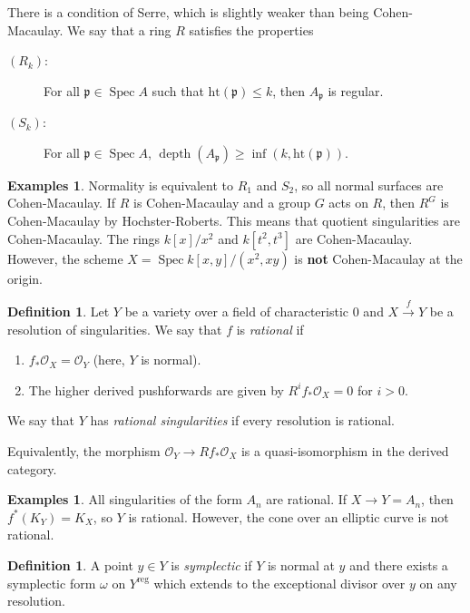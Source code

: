 \documentclass[leqno, openany]{memoir}
\theoremstyle{definition}
\newtheorem{defn}[thm]{Definition}
\newtheorem{exms}[thm]{Examples}
\theoremstyle{remark}
\theoremstyle{plain}
\theoremstyle{definition}
\theoremstyle{remark}
\newcommand{\mc}[1]{\mathcal{#1}}
\newcommand{\mf}[1]{\mathfrak{#1}}
\newcommand{\mr}[1]{\mathrm{#1}}
\DeclareMathOperator{\Spec}{Spec}
\begin{document}
There is a condition of Serre, which is slightly weaker than being Cohen-Macaulay. We say that a ring $R$ satisfies the properties
\begin{description}
    \item[$(R_k)$:] For all $\mf{p} \in \Spec A$ such that $\mr{ht}(\mf{p}) \leq k$, then $A_{\mf{p}}$ is regular.
    \item[$(S_k)$:] For all $\mf{p} \in \Spec A$, $\operatorname{depth}(A_{\mf{p}}) \geq \inf (k, \mr{ht}(\mf{p}))$.
\end{description}

\begin{exms}
    Normality is equivalent to $R_1$ and $S_2$, so all normal surfaces are Cohen-Macaulay. If $R$ is Cohen-Macaulay and a group $G$ acts on $R$, then $R^G$ is Cohen-Macaulay by Hochster-Roberts. This means that quotient singularities are Cohen-Macaulay. The rings $k[x]/x^2$ and $k[t^2, t^3]$ are Cohen-Macaulay. However, the scheme $X = \Spec k[x,y]/(x^2, xy)$ is \textbf{not} Cohen-Macaulay at the origin.
\end{exms}

\begin{defn}
    Let $Y$ be a variety over a field of characteristic $0$ and $X \xrightarrow{f} Y$ be a resolution of singularities. We say that $f$ is \textit{rational} if 
    \begin{enumerate}
        \item $f_* \mc{O}_X = \mc{O}_Y$ (here, $Y$ is normal).
        \item The higher derived pushforwards are given by $R^i f_* \mc{O}_X = 0$ for $i > 0$.
    \end{enumerate}
    We say that $Y$ has \textit{rational singularities} if every resolution is rational.
\end{defn}

Equivalently, the morphism $\mc{O}_Y \to R f_* \mc{O}_X$ is a quasi-isomorphism in the derived category.

\begin{exms}
    All singularities of the form $A_n$ are rational. If $X \to Y = A_n$, then $f^*(K_Y) = K_X$, so $Y$ is rational. However, the cone over an elliptic curve is not rational.
\end{exms}

\begin{defn}
    A point $y \in Y$ is \textit{symplectic} if $Y$ is normal at $y$ and there exists a symplectic form $\omega$ on $Y^{\mr{reg}}$ which extends to the exceptional divisor over $y$ on any resolution.
\end{defn}
\end{document}
